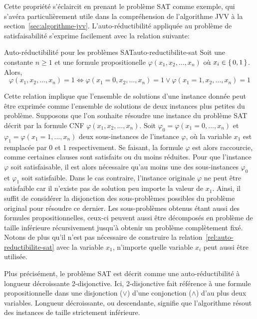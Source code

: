 Cette propriété s'éclaircit en prenant le problème SAT comme exemple, qui s'avéra particulièrement utile dans la compréhension de l'algorithme JVV à la section~\ref{sec:algorithme-jvv}. L'auto-réductibilité appliquée au problème de satisfaisabilité s'exprime facilement avec la relation suivante:

\begin{relation}{Auto-réductibilité pour les problèmes SAT}{auto-reductibilite-sat}
    Soit une constante $n \geq 1$ et une formule propositionelle $\varphi(x_{1}, x_{2}, \dots, x_{n})$ où $x_{i} \in \set{ 0, 1 }$. Alors,
    \begin{equation*}
        \varphi(x_{1}, x_{2}, \dots, x_{n}) = 1 \iff \varphi(x_{1}=0, x_{2}, \dots, x_{n}) = 1 \lor \varphi(x_{1}=1, x_{2}, \dots, x_{n}) = 1
    \end{equation*}
\end{relation}

Cette relation implique que l'ensemble de solutions d'une instance donnée peut être exprimée comme l'ensemble de solutions de deux instances plus petites du problème. Supposons que l'on souhaite résoudre une instance du problème SAT décrit par la formule CNF $\varphi(x_{1}, x_{2}, \dots, x_{n})$. Soit $\varphi_{0} = \varphi(x_{1}=0, \dots, x_{n})$ et $\varphi_{1} = \varphi(x_{1}=1, \dots, x_{n})$ deux sous-instances de l'instance $\varphi$, où la variable $x_{1}$ est remplacée par 0 et 1 respectivement. Se faisant, la formule $\varphi$ est alors raccourcie, comme certaines clauses sont satisfaits ou du moins réduites. Pour que l'instance $\varphi$ soit satisfaisable, il est alors nécessaire qu'au moins une des sous-instances $\varphi_{0}$ et $\varphi_{1}$ soit satisfaible. Dans le cas contraire, l'instance originale $\varphi$ ne peut être satisfaible car il n'existe pas de solution peu importe la valeur de $x_{1}$. Ainsi, il suffit de considérer la disjonction des sous-problèmes possibles du problème original pour résoudre ce dernier. Les sous-problèmes obtenus étant aussi des formules propositionnelles, ceux-ci peuvent aussi être décomposés en problème de taille inférieure récursivement jusqu'à obtenir un problème complètement fixé. Notons de plus qu'il n'est pas nécessaire de construire la relation~\ref{rel:auto-reductibilite-sat} avec la variable $x_{1}$, n'importe quelle variable $x_{i}$ peut aussi être utilisée.

Plus précisément, le problème SAT est décrit comme une auto-réductibilité à longueur décroissante 2-disjonctive. Ici, 2-disjonctive fait référence à une formule propositionnelle dans une disjonction ($\lor$) d'une conjonction ($\land$) d'au plus deux variables. Longueur décroissante, ou descendante, signifie que l'algorithme résout des instances de taille strictement inférieure.

